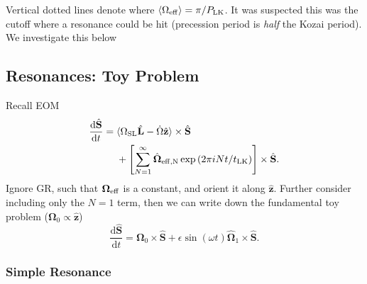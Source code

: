 \documentclass[10pt,
        usenames, %
        dvipsnames, %
    ]{article}
\newcommand*{\rd}[2]{\frac{\mathrm{d}#1}{\mathrm{d}#2}}
\newcommand*{\bm}[1]{\boldsymbol{\mathbf{#1}}}
\newcommand*{\uv}[1]{\hat{\bm{#1}}}
\newcommand*{\ev}[1]{\langle#1\rangle}
\newcommand*{\p}[1]{\left(#1\right)}
\newcommand*{\s}[1]{\left[#1\right]}
\begin{document}
Vertical dotted lines denote where $\ev{\Omega_{\rm eff}} = \pi / P_{\rm LK}$.
It was suspected this was the cutoff where a resonance could be hit (precession
period is \emph{half} the Kozai period). We investigate this below

\subsection{Resonances: Toy Problem}

Recall EOM
\begin{align}
    \rd{\uv{S}}{t} ={}& \ev{\Omega_{\rm SL}\uv{L} - \dot{\Omega}\uv{z}}
        \times \uv{S}\nonumber\\
        &+ \s{
            \sum\limits_{N = 1}^\infty \uv{\Omega}_{\rm eff, N}
            \exp\p{2\pi i N t / t_{\rm LK}}} \times \uv{S}.
\end{align}
Ignore GR, such that $\bm{\Omega}_{\rm eff}$ is a constant, and orient it along
$\uv{z}$. Further consider including only the $N = 1$ term, then we can write
down the fundamental toy problem ($\bm{\Omega}_{0} \propto \uv{z}$)
\begin{equation}
    \rd{\uv{S}}{t} = \bm{\Omega}_0 \times \uv{S}
        + \epsilon \sin \p{\omega t} \uv{\Omega}_1 \times \uv{S}.
        \label{eq:eom}
\end{equation}

\subsubsection{Simple Resonance}
\end{document}
